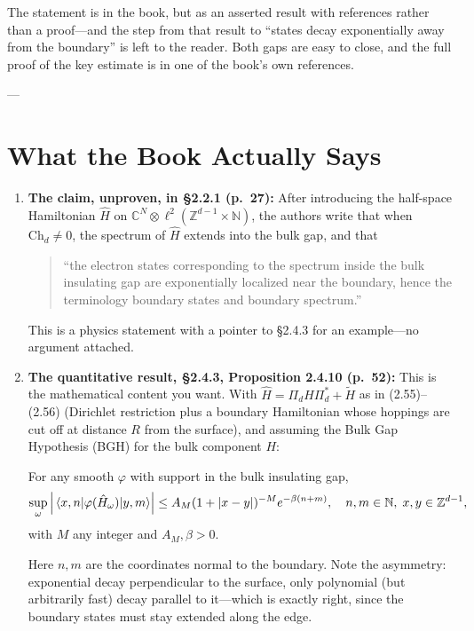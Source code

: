 The statement is in the book, but as an asserted result with references rather than a proof---and the step from that result to ``states decay exponentially away from the boundary'' is left to the reader. Both gaps are easy to close, and the full proof of the key estimate is in one of the book's own references.

---

\section{What the Book Actually Says}

\begin{enumerate}
    \item \textbf{The claim, unproven, in \S2.2.1 (p.~27):} 
    After introducing the half-space Hamiltonian $\hat{H}$ on $\mathbb{C}^N \otimes \ell^2(\mathbb{Z}^{d-1} \times \mathbb{N})$, the authors write that when $\mathrm{Ch}_d \neq 0$, the spectrum of $\hat{H}$ extends into the bulk gap, and that 
    \begin{quote}
        ``the electron states corresponding to the spectrum inside the bulk insulating gap are exponentially localized near the boundary, hence the terminology boundary states and boundary spectrum.''
    \end{quote}
    This is a physics statement with a pointer to \S2.4.3 for an example---no argument attached.

    \item \textbf{The quantitative result, \S2.4.3, Proposition 2.4.10 (p.~52):} 
    This is the mathematical content you want. With $\hat{H} = \Pi_d H \Pi_d^* + \tilde{H}$ as in (2.55)--(2.56) (Dirichlet restriction plus a boundary Hamiltonian whose hoppings are cut off at distance $R$ from the surface), and assuming the Bulk Gap Hypothesis (BGH) for the bulk component $H$:

    For any smooth $\varphi$ with support in the bulk insulating gap,
    \begin{equation*}
        \sup_{\omega} \abs{\matrixel{x,n}{\varphi(\hat{H}_\omega)}{y,m}} \le A_M (1+|x-y|)^{-M} e^{-\beta(n+m)}, \quad n,m \in \mathbb{N}, \; x,y \in \mathbb{Z}^{d-1},
    \end{equation*}
    with $M$ any integer and $A_M, \beta > 0$.

    Here $n, m$ are the coordinates normal to the boundary. Note the asymmetry: exponential decay perpendicular to the surface, only polynomial (but arbitrarily fast) decay parallel to it---which is exactly right, since the boundary states must stay extended along the edge.


\end{enumerate}
